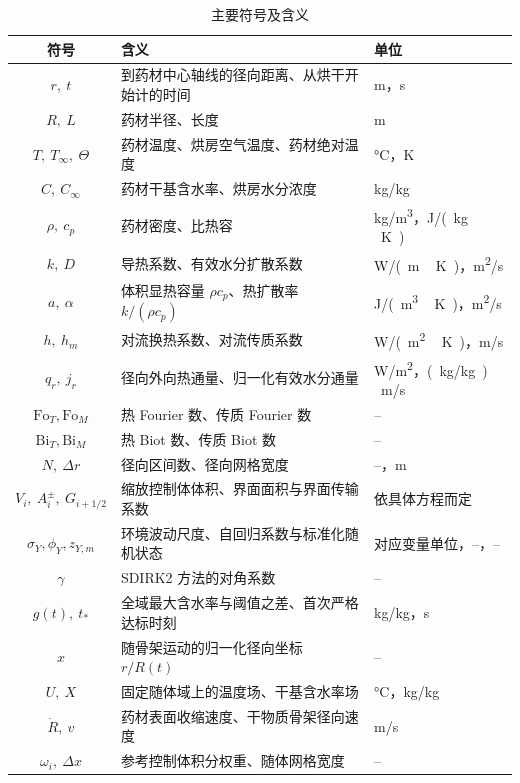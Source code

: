 \documentclass[withoutpreface,bwprint]{cumcmthesis}
\begin{document}
\begin{table}[H]
\centering
\caption{主要符号及含义}
\label{tab:symbols}
{\small
\begin{tabular}{cp{}p{}}
\toprule[1.2pt]
符号 & 含义 & 单位 \\
\midrule
$r,\ t$ & 到药材中心轴线的径向距离、从烘干开始计的时间 & \si{m}，\si{s} \\
$R,\ L$ & 药材半径、长度 & \si{m} \\
$T,\ T_\infty,\ \Theta$ & 药材温度、烘房空气温度、药材绝对温度 & \si{\celsius}，\si{K} \\
$C,\ C_\infty$ & 药材干基含水率、烘房水分浓度 & \si{kg/kg} \\
$\rho,\ c_p$ & 药材密度、比热容 & \si{kg/m^3}，\si{J/(kg\,K)} \\
$k,\ D$ & 导热系数、有效水分扩散系数 & \si{W/(m\,K)}，\si{m^2/s} \\
$a,\ \alpha$ & 体积显热容量 $\rho c_p$、热扩散率 $k/(\rho c_p)$ & \si{J/(m^3\,K)}，\si{m^2/s} \\
$h,\ h_m$ & 对流换热系数、对流传质系数 & \si{W/(m^2\,K)}，\si{m/s} \\
$q_r,\ j_r$ & 径向外向热通量、归一化有效水分通量 & \si{W/m^2}，\si{(kg/kg)\,m/s} \\
$\mathrm{Fo}_T,\mathrm{Fo}_M$ & 热 Fourier 数、传质 Fourier 数 & -- \\
$\mathrm{Bi}_T,\mathrm{Bi}_M$ & 热 Biot 数、传质 Biot 数 & -- \\
$N,\ \Delta r$ & 径向区间数、径向网格宽度 & --，\si{m} \\
$V_i,\ A_i^{\pm},\ G_{i+1/2}$ & 缩放控制体体积、界面面积与界面传输系数 & 依具体方程而定 \\
$\sigma_Y,\phi_Y,z_{Y,m}$ & 环境波动尺度、自回归系数与标准化随机状态 & 对应变量单位，--，-- \\
$\gamma$ & SDIRK2 方法的对角系数 & -- \\
$g(t),\ t_*$ & 全域最大含水率与阈值之差、首次严格达标时刻 & \si{kg/kg}，\si{s} \\
$x$ & 随骨架运动的归一化径向坐标 $r/R(t)$ & -- \\
$U,\ X$ & 固定随体域上的温度场、干基含水率场 & \si{\celsius}，\si{kg/kg} \\
$\dot R,\ v$ & 药材表面收缩速度、干物质骨架径向速度 & \si{m/s} \\
$\omega_i,\ \Delta x$ & 参考控制体积分权重、随体网格宽度 & -- \\
\bottomrule[1.2pt]
\end{tabular}}
\end{table}
\end{document}
